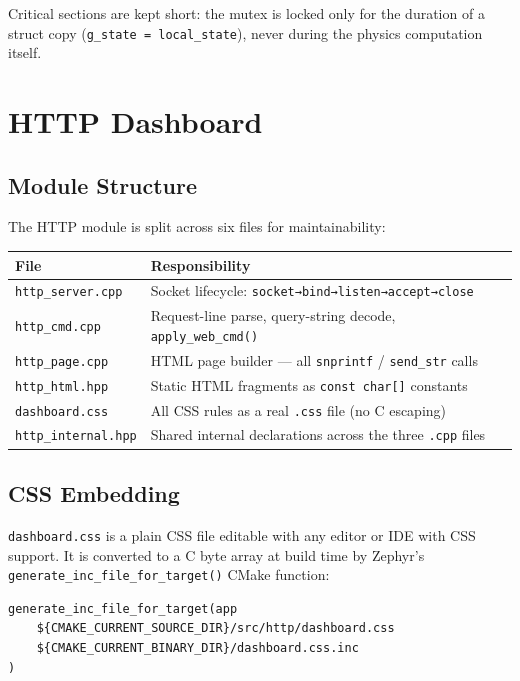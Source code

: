 \documentclass[11pt,a4paper]{article}
\begin{document}
Critical sections are kept short: the mutex is locked only for the duration of
a struct copy (\texttt{g\_state = local\_state}), never during the physics
computation itself.

\section{HTTP Dashboard}

\subsection{Module Structure}

The HTTP module is split across six files for maintainability:

\begin{center}
\begin{tabular}{ll}
\toprule
File & Responsibility \\
\midrule
\texttt{http\_server.cpp} & Socket lifecycle: \texttt{socket→bind→listen→accept→close} \\
\texttt{http\_cmd.cpp} & Request-line parse, query-string decode, \texttt{apply\_web\_cmd()} \\
\texttt{http\_page.cpp} & HTML page builder — all \texttt{snprintf} / \texttt{send\_str} calls \\
\texttt{http\_html.hpp} & Static HTML fragments as \texttt{const char[]} constants \\
\texttt{dashboard.css} & All CSS rules as a real \texttt{.css} file (no C escaping) \\
\texttt{http\_internal.hpp} & Shared internal declarations across the three \texttt{.cpp} files \\
\bottomrule
\end{tabular}
\end{center}

\subsection{CSS Embedding}

\texttt{dashboard.css} is a plain CSS file editable with any editor or IDE with
CSS support. It is converted to a C byte array at build time by Zephyr's
\texttt{generate\_inc\_file\_for\_target()} CMake function:

\begin{lstlisting}[language={[LaTeX]TeX}, caption={CMakeLists.txt — CSS embedding}]
generate_inc_file_for_target(app
    ${CMAKE_CURRENT_SOURCE_DIR}/src/http/dashboard.css
    ${CMAKE_CURRENT_BINARY_DIR}/dashboard.css.inc
)
\end{lstlisting}
\end{document}
